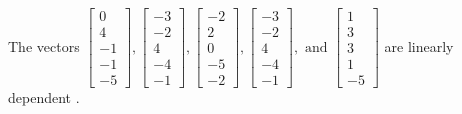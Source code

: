 \begin{exercise}
\begin{exerciseStatement}
  \end{exerciseStatement}
  \begin{exerciseAnswer}
   The vectors \(\left[\begin{array}{r}
0 \\
4 \\
-1 \\
-1 \\
-5
\end{array}\right] , \left[\begin{array}{r}
-3 \\
-2 \\
4 \\
-4 \\
-1
\end{array}\right] , \left[\begin{array}{r}
-2 \\
2 \\
0 \\
-5 \\
-2
\end{array}\right] , \left[\begin{array}{r}
-3 \\
-2 \\
4 \\
-4 \\
-1
\end{array}\right] , \text{ and } \left[\begin{array}{r}
1 \\
3 \\
3 \\
1 \\
-5
\end{array}\right]\) are 
  	 linearly dependent  .
  


  \end{exerciseAnswer}
\end{exercise}